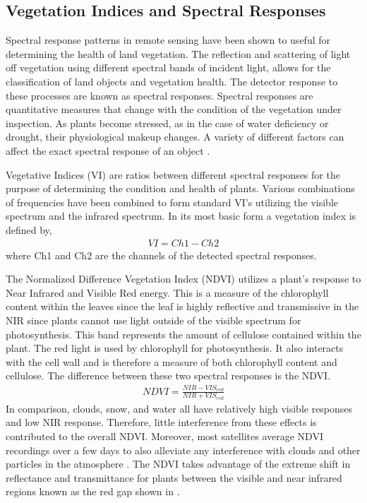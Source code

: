 \subsection{Vegetation Indices and Spectral Responses}
Spectral response patterns in remote sensing have been shown to useful \cite{mississippi}\cite{schott}\cite{harris} for determining the health of land vegetation.  The reflection and scattering of light off vegetation using different spectral bands of incident light, allows for the classification of land objects and vegetation health.  The detector response to these processes are known as spectral responses.  Spectral responses are quantitative measures that change with the condition of the vegetation under inspection.  As plants become stressed, as in the case of water deficiency or drought, their physiological makeup changes.  A variety of different factors can affect the exact spectral response of an object \cite{remotesensing}.

Vegetative Indices (VI) are ratios between different spectral responses for the purpose of determining the condition and health of plants.  Various combinations of frequencies have been combined to form standard VI’s utilizing the visible spectrum and the infrared spectrum. In its most basic form a vegetation index is defined by,
%
\begin{align}
    VI = Ch1 - Ch2
\end{align}
%
where Ch1 and Ch2 are the channels of the detected spectral responses.

The Normalized Difference Vegetation Index (NDVI) utilizes a plant's response to Near Infrared and Visible Red energy.  This is a measure of the chlorophyll content within the leaves since the leaf is highly reflective and transmissive in the NIR since plants cannot use light outside of the visible spectrum for photosynthesis.  This band represents the amount of cellulose contained within the plant.  The red light is used by chlorophyll for photosynthesis.  It also interacts with the cell wall and is therefore a measure of both chlorophyll content and cellulose.  The difference between these two spectral responses is the NDVI.
%
\begin{align}
    NDVI = \frac{NIR - VIS_{red}}{NIR + VIS_{red}}
\end{align}
%
In comparison, clouds, snow, and water all have relatively high visible responses and low NIR response.  Therefore, little interference from these effects is contributed to the overall NDVI.  Moreover, most satellites average NDVI recordings over a few days to also alleviate any interference with clouds and other particles in the atmosphere \cite{remotesensing}.
The NDVI takes advantage of the extreme shift in reflectance and transmittance for plants between the visible and near infrared regions known as the red gap shown in \cite{vanderbilt}.

